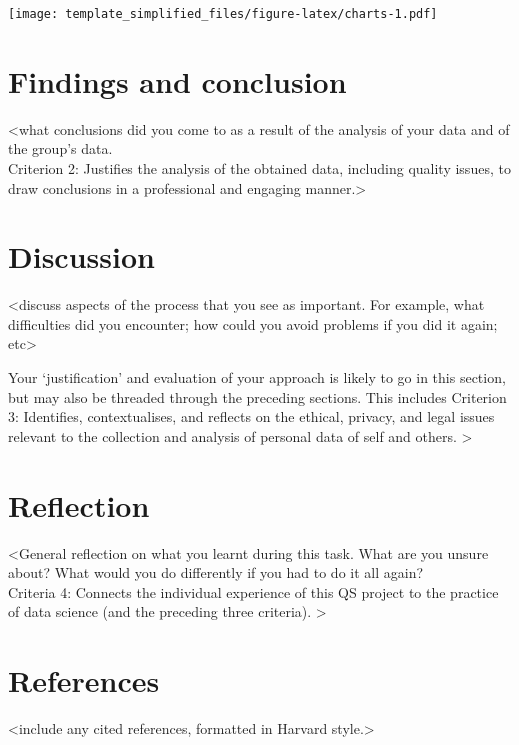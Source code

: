 \documentclass[
]{article}
\begin{document}
\texttt{[image: template\_simplified\_files/figure-latex/charts-1.pdf]}

\hypertarget{findings-and-conclusion}{%
\section{Findings and conclusion}\label{findings-and-conclusion}}

\textless what conclusions did you come to as a result of the analysis
of your data and of the group's data.\\
Criterion 2: Justifies the analysis of the obtained data, including
quality issues, to draw conclusions in a professional and engaging
manner.\textgreater{}

\hypertarget{discussion}{%
\section{Discussion}\label{discussion}}

\textless discuss aspects of the process that you see as important. For
example, what difficulties did you encounter; how could you avoid
problems if you did it again; etc\textgreater{}

Your `justification' and evaluation of your approach is likely to go in
this section, but may also be threaded through the preceding sections.
This includes Criterion 3: Identifies, contextualises, and reflects on
the ethical, privacy, and legal issues relevant to the collection and
analysis of personal data of self and others. \textgreater{}

\hypertarget{reflection}{%
\section{Reflection}\label{reflection}}

\textless General reflection on what you learnt during this task. What
are you unsure about? What would you do differently if you had to do it
all again?\\
Criteria 4: Connects the individual experience of this QS project to the
practice of data science (and the preceding three criteria).
\textgreater{}

\hypertarget{references}{%
\section{References}\label{references}}

\textless include any cited references, formatted in Harvard
style.\textgreater{}
\end{document}
